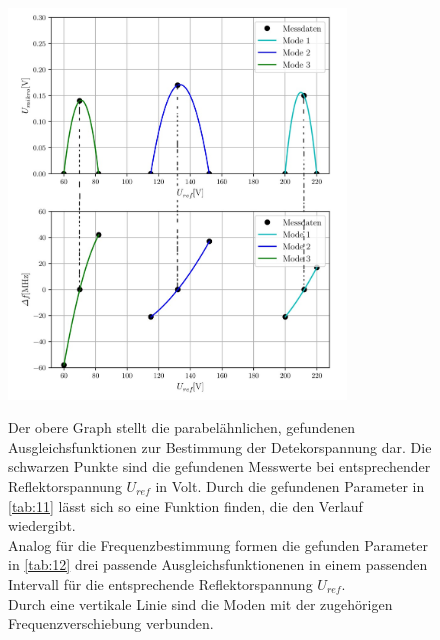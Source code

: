 \begin{figure}
    \centering
    \includegraphics[width=0.8\textwidth]{bilder/SO.jpg}
    \label{fig:123}
    \caption{Der obere Graph stellt die parabelähnlichen, gefundenen Ausgleichsfunktionen zur Bestimmung der Detekorspannung dar. Die schwarzen
            Punkte sind die gefundenen Messwerte bei entsprechender Reflektorspannung $U_{ref}$ in Volt. Durch die gefundenen Parameter in \ref{tab:11}
            lässt sich so eine Funktion finden, die den Verlauf wiedergibt.    \\
            Analog für die Frequenzbestimmung formen die gefunden Parameter in \ref{tab:12} drei passende Ausgleichsfunktionenen in einem passenden 
            Intervall für die entsprechende Reflektorspannung $U_{ref}$. \\
            Durch eine vertikale Linie sind die Moden mit der zugehörigen Frequenzverschiebung verbunden.} 
    \label{fig:gimp}
\end{figure}

